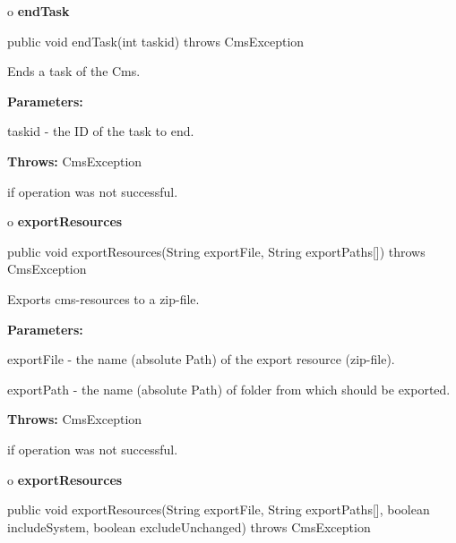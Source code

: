 o {\bf endTask}

\begin{PRE}
 public void endTask(int taskid) throws CmsException
\end{PRE}

\begin{description}
\htmlDD Ends a task of the Cms.

\begin{description}
\item {\bf Parameters:}

taskid - the ID of the task to end.
\item {\bf Throws:} CmsException

if operation was not successful.
\end{description}

\end{description}

o {\bf exportResources}

\begin{PRE}
 public void exportResources(String exportFile,
                             String exportPaths[]) throws CmsException
\end{PRE}

\begin{description}
\htmlDD Exports cms-resources to a zip-file.

\begin{description}
\item {\bf Parameters:}

exportFile - the name (absolute Path) of the export resource (zip-file).

exportPath - the name (absolute Path) of folder from which should be exported.

\item {\bf Throws:} CmsException

if operation was not successful.
\end{description}

\end{description}

o {\bf exportResources}

\begin{PRE}
 public void exportResources(String exportFile,
                             String exportPaths[],
                             boolean includeSystem,
                             boolean excludeUnchanged) throws CmsException
\end{PRE}

